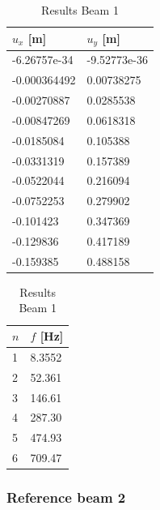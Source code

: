 \begin{table}[H]
\begin{tabular}{ll}
\hline
$u_x$ [m] & $u_y$ [m] \\
\hline
-6.26757e-34 & -9.52773e-36 \\
-0.000364492 & 0.00738275 \\
-0.00270887 & 0.0285538 \\
-0.00847269 & 0.0618318 \\
-0.0185084 & 0.105388 \\
-0.0331319 & 0.157389 \\
-0.0522044 & 0.216094 \\
-0.0752253 & 0.279902 \\
-0.101423 & 0.347369 \\
-0.129836 & 0.417189 \\
-0.159385 & 0.488158 \\
\hline
\end{tabular}
\begin{tabular}{ll}
\hline
$n$ & $f$ [Hz] \\
\hline
1 & 8.3552 \\
2 & 52.361 \\
3 & 146.61 \\
4 & 287.30 \\
5 & 474.93 \\
6 & 709.47 \\
\hline
\end{tabular}
\caption{Results Beam 1}
\end{table}

%
%
%

\newpage
\subsubsection*{Reference beam 2}

